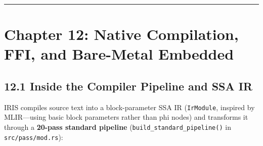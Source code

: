 \documentclass[
  english,
  oneside]{book}
\begin{document}
\begin{center}\rule{0.5\linewidth}{0.5pt}\end{center}

\chapter{Chapter 12: Native Compilation, FFI, and Bare-Metal
Embedded}\label{chapter-12-native-compilation-ffi-and-bare-metal-embedded}

\section{12.1 Inside the Compiler Pipeline and SSA
IR}\label{inside-the-compiler-pipeline-and-ssa-ir}

IRIS compiles source text into a block-parameter SSA IR
(\texttt{IrModule}, inspired by MLIR---using basic block parameters
rather than phi nodes) and transforms it through a \textbf{20-pass
standard pipeline} (\texttt{build\_standard\_pipeline()} in
\texttt{src/pass/mod.rs}):
\end{document}
